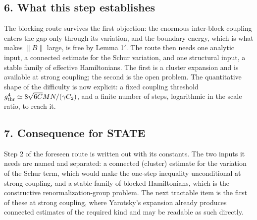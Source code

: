 \documentclass[11pt,a4paper]{article}
\begin{document}
\hypertarget{what-this-step-establishes}{%
\subsection{6. What this step
establishes}\label{what-this-step-establishes}}

The blocking route survives the first objection: the enormous
inter-block coupling enters the gap only through its variation, and the
boundary energy, which is what makes \(\|B\|\) large, is free by Lemma
1\('\). The route then needs one analytic input, a connected estimate
for the Schur variation, and one structural input, a stable family of
effective Hamiltonians. The first is a cluster expansion and is
available at strong coupling; the second is the open problem. The
quantitative shape of the difficulty is now explicit: a fixed coupling
threshold \(g_{\rm thr}^4\simeq8\sqrt{6C}MN/(\gamma C_2)\), and a finite
number of steps, logarithmic in the scale ratio, to reach it.

\hypertarget{consequence-for-state}{%
\subsection{7. Consequence for STATE}\label{consequence-for-state}}

Step 2 of the foreseen route is written out with its constants. The two
inputs it needs are named and separated: a connected (cluster) estimate
for the variation of the Schur term, which would make the one-step
inequality unconditional at strong coupling, and a stable family of
blocked Hamiltonians, which is the constructive renormalization-group
problem. The next tractable item is the first of these at strong
coupling, where Yarotsky's expansion already produces connected
estimates of the required kind and may be readable as such directly.
\end{document}
